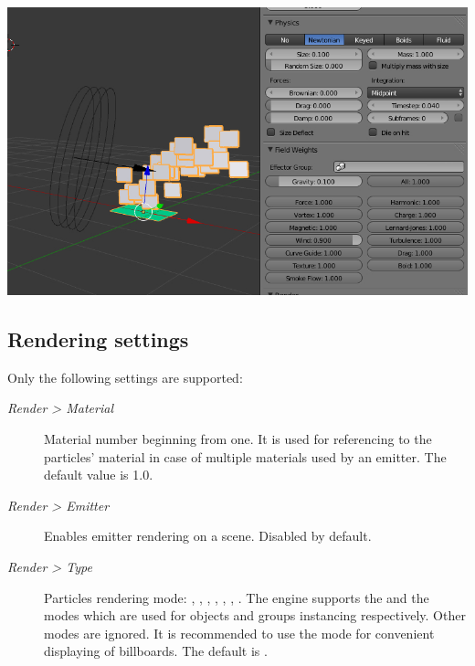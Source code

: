 \documentclass[a4paper,12pt,oneside]{sphinxmanual}
\begin{document}
{\hfill\includegraphics[width=1.000\linewidth]{particles_settings2.jpg}\hfill}


\subsection{Rendering settings}
\label{particles:id11}
Only the following settings are supported:
\begin{description}
\item[{\emph{Render \textgreater{} Material}}] \leavevmode
Material number beginning from one. It is used for referencing to the particles' material in case of multiple materials used by an emitter. The default value is 1.0.

\item[{\emph{Render \textgreater{} Emitter}}] \leavevmode
Enables emitter rendering on a scene. Disabled by default.

\item[{\emph{Render \textgreater{} Type}}] \leavevmode
Particles rendering mode: , , , , , , . The engine supports the  and the  modes which are used for objects and groups instancing respectively. Other modes are ignored. It is recommended to use the  mode for convenient displaying of billboards. The default is .

\end{description}
\end{document}
